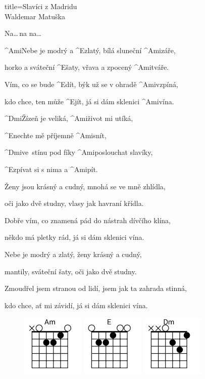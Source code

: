 \begin{song}{title=\predtitle\centering Slavíci z Madridu \\\large Waldemar Matuška \vspace*{-0.3cm}}  %
\begin{centerjustified}

	Na\elipsa\dots\,na na\elipsa\dots

\sloka
	^{Ami\z}Nebe je modrý a ^{E\z}zlatý, bílá sluneční ^{Ami\z}záře,\:\:

	horko a sváteční ^{E\z}šaty, vřava a zpocený ^{Ami\z}tváře.

	Vím, co se bude ^{E}dít, býk už se v ohradě ^{Ami\z}vzpíná,

	kdo chce, ten může ^{E\z}jít, já si dám sklenici ^{Ami\z}vína.

	^{Dmi\z}Žízeň je veliká, ^{Ami\z}život mi utíká,

	^{E\z}nechte mě příjemně ^{Ami\z}snít,

	^{Dmi\z}ve~stínu pod fíky ^{Ami\z}poslouchat slavíky,

	^{E\z}zpívat si s nima a ^{Ami\z}pít.\:\:\:\:\:

\sloka
	Ženy jsou krásný a cudný, mnohá se ve mně zhlídla,

	oči jako dvě studny, vlasy jak havraní křídla.

	Dobře vím, co znamená pád do nástrah dívčího klína,

	někdo má pletky rád, já si dám sklenici vína.


\sloka
	Nebe je modrý a zlatý, ženy krásný a cudný,

	mantily, sváteční šaty, oči jako dvě studny.

	Zmoudřel jsem stranou od lidí, jsem jak ta zahrada stinná,

	kdo chce, ať mi závidí, já si dám sklenici vína.
	


\end{centerjustified}
\setcounter{Slokočet}{0}
\end{song}
\begin{figure}[h]
\predtitle\centering
\includegraphics[width=3cm]{../Akordy/am}
\includegraphics[width=3cm]{../Akordy/e}
\includegraphics[width=3cm]{../Akordy/dm}
\end{figure}
